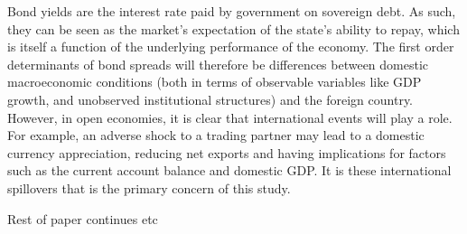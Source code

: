 \documentclass[/../base.tex]{subfiles}
\begin{document}
Bond yields are the interest rate paid by government on sovereign debt. As such, they can be seen as the market's expectation of the state's ability to repay, which is itself a function of the underlying performance of the economy. The first order determinants of bond spreads will therefore be differences between domestic macroeconomic conditions (both in terms of observable variables like GDP growth, and unobserved institutional structures) and the foreign country. However, in open economies, it is clear that international events will play a role. For example, an adverse shock to a trading partner may lead to a domestic currency appreciation, reducing net exports and having implications for factors such as the current account balance and domestic GDP. It is these international spillovers that is the primary concern of this study. 

Rest of paper continues etc
\end{document}
